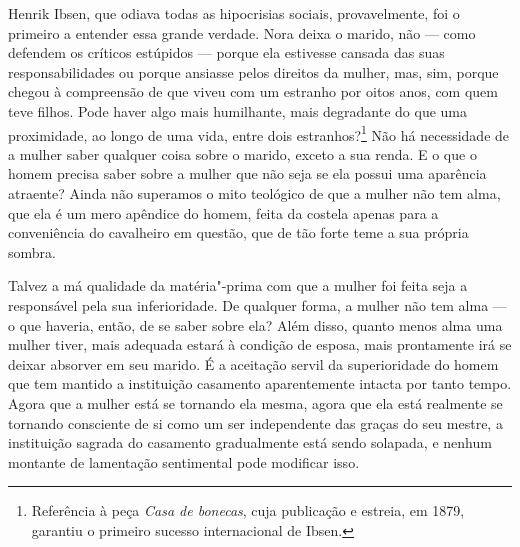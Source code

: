 Henrik Ibsen, que odiava todas as hipocrisias sociais, provavelmente,
foi o primeiro a entender essa grande verdade. Nora deixa o marido,
não --- como defendem os críticos estúpidos --- porque ela estivesse
cansada das suas responsabilidades ou porque ansiasse pelos direitos da
mulher, mas, sim, porque chegou à compreensão de que viveu com um
estranho por oitos anos, com quem teve filhos. Pode haver algo mais
humilhante, mais degradante do que uma proximidade, ao longo de uma
vida, entre dois estranhos?\footnote{Referência à peça \textit{Casa de bonecas}, cuja publicação e estreia, em 1879, garantiu o primeiro sucesso internacional de Ibsen.} Não há necessidade de a mulher saber
qualquer coisa sobre o marido, exceto a sua renda. E o que o homem
precisa saber sobre a mulher que não seja se ela possui uma aparência
atraente? Ainda não superamos o mito teológico de que a mulher não tem
alma, que ela é um mero apêndice do homem, feita da costela apenas para
a conveniência do cavalheiro em questão, que de tão forte teme a sua
própria sombra.\label{ref7}

Talvez a má qualidade da matéria"-prima com que a mulher foi feita seja a
responsável pela sua inferioridade. De qualquer forma, a mulher não tem
alma --- o que haveria, então, de se saber sobre ela? Além disso, quanto
menos alma uma mulher tiver, mais adequada estará à condição de esposa,
mais prontamente irá se deixar absorver em seu marido. É a aceitação
servil da superioridade do homem que tem mantido a instituição casamento
aparentemente intacta por tanto tempo. Agora que a mulher está se
tornando ela mesma, agora que ela está realmente se tornando consciente
de si como um ser independente das graças do seu mestre, a instituição
sagrada do casamento gradualmente está sendo solapada, e nenhum montante
de lamentação sentimental pode modificar isso.

